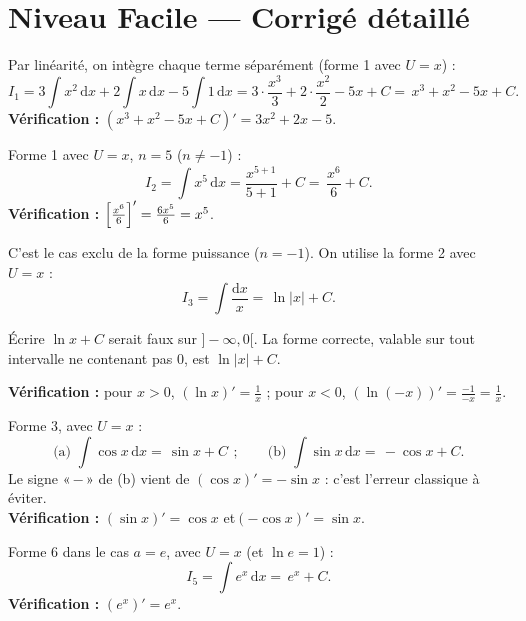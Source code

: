 \documentclass[11pt,a4paper]{article}
\newcommand{\dd}{\mathrm{d}}
\begin{document}
\section*{Niveau Facile — Corrigé détaillé}

\begin{corr}
Par linéarité, on intègre chaque terme séparément (forme 1 avec $U=x$) :
\[
I_1=3\int x^2\,\dd x+2\int x\,\dd x-5\int 1\,\dd x
=3\cdot\frac{x^3}{3}+2\cdot\frac{x^2}{2}-5x+C
=\boxed{\,x^3+x^2-5x+C.\,}
\]
\textbf{Vérification :} $(x^3+x^2-5x+C)'=3x^2+2x-5$. \checkmark
\end{corr}

\begin{corr}[2 — puissance de $x$]
Forme 1 avec $U=x$, $n=5$ ($n\neq -1$) :
\[
I_2=\int x^5\,\dd x=\frac{x^{5+1}}{5+1}+C=\boxed{\,\frac{x^6}{6}+C.\,}
\]
\textbf{Vérification :} $\Bigl[\tfrac{x^6}{6}\Bigr]'=\tfrac{6x^5}{6}=x^5$. \checkmark
\end{corr}

\begin{corr}[3 — la forme $\dd U/U$]
C'est le cas exclu de la forme puissance ($n=-1$). On utilise la forme 2 avec $U=x$ :
\[
I_3=\int \frac{\dd x}{x}=\boxed{\,\ln|x|+C.\,}
\]
\begin{attention}
Écrire $\ln x+C$ serait faux sur $]-\infty,0[$. La forme correcte, valable sur tout intervalle
ne contenant pas $0$, est $\ln|x|+C$.
\end{attention}
\textbf{Vérification :} pour $x>0$, $(\ln x)'=\tfrac1x$ ; pour $x<0$, $(\ln(-x))'=\tfrac{-1}{-x}=\tfrac1x$. \checkmark
\end{corr}

\begin{corr}
Forme 3, avec $U=x$ :
\[
\text{(a) } \int \cos x\,\dd x=\boxed{\,\sin x+C\,}\ ;\qquad
\text{(b) } \int \sin x\,\dd x=\boxed{\,-\cos x+C.\,}
\]
Le signe «\,$-$\,» de (b) vient de $(\cos x)'=-\sin x$ : c'est l'erreur classique à éviter.\\
\textbf{Vérification :} $(\sin x)'=\cos x$ \checkmark\quad et\quad $(-\cos x)'=\sin x$. \checkmark
\end{corr}

\begin{corr}[5 — exponentielle]
Forme 6 dans le cas $a=e$, avec $U=x$ (et $\ln e=1$) :
\[
I_5=\int e^{x}\,\dd x=\boxed{\,e^{x}+C.\,}
\]
\textbf{Vérification :} $(e^x)'=e^x$. \checkmark
\end{corr}
\end{document}
